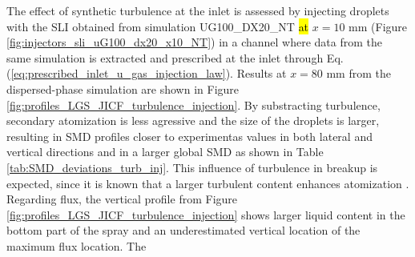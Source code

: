 The effect of synthetic turbulence at the inlet is assessed by injecting droplets with the SLI obtained from simulation UG100\_DX20\_NT \hl{at} $x = 10$ mm (Figure \ref{fig:injectors_sli_uG100_dx20_x10_NT}) in a channel where data from the same simulation is extracted and prescribed at the inlet through Eq. (\ref{eq:prescribed_inlet_u_gas_injection_law}). Results at $x = 80$ mm from the dispersed-phase simulation are shown in Figure \ref{fig:profiles_LGS_JICF_turbulence_injection}. By substracting turbulence, secondary atomization is less agressive and the size of the droplets is larger, resulting in SMD profiles closer to experimentas values in both lateral and vertical directions and in a larger global SMD as shown in Table \ref{tab:SMD_deviations_turb_inj}. This influence of turbulence in breakup is expected, since it is known that a larger turbulent content enhances atomization . Regarding flux, the vertical profile from Figure \ref{fig:profiles_LGS_JICF_turbulence_injection} shows larger liquid content in the bottom part of the spray and an underestimated vertical location of the maximum flux location. The 

